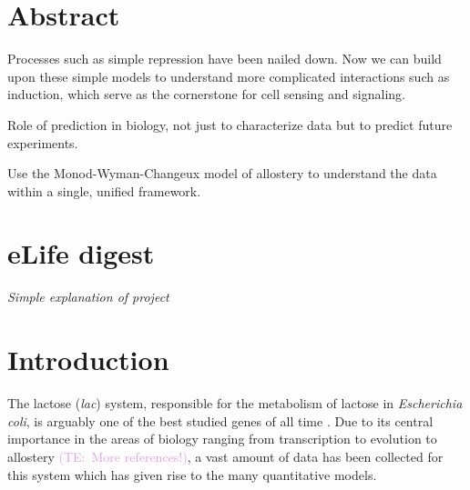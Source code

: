 \documentclass[10pt,letterpaper]{article}
\date{}
\newcommand{\talComment}[1]{\textcolor{Plum}{(TE:~#1)}}
\begin{document}

	
\vspace*{0.35in}

\begin{flushleft}
{\Large
\textbf{}
}
\end{flushleft}


\section*{Abstract} 

Processes such as simple repression have been nailed down. Now we can build upon these simple models to understand more complicated interactions such as induction, which serve as the cornerstone for cell sensing and signaling.

Role of prediction in biology, not just to characterize data but to predict future experiments.

Use the Monod-Wyman-Changeux model of
allostery to understand the data within a single, unified framework.


\section*{eLife digest} 

\textit{Simple explanation of project}


\section*{Introduction}

The lactose (\textit{lac}) system, responsible for the metabolism of lactose in
\textit{Escherichia coli}, is arguably one of the best studied genes of all time
\cite{MullerHill1996a}. Due to its central importance in the areas of biology
ranging from transcription to evolution to allostery \cite{Razo-Mejia2014}
\talComment{More references!}, a vast amount of data has been collected for this
system which has given rise to the many quantitative models.
\end{document}
